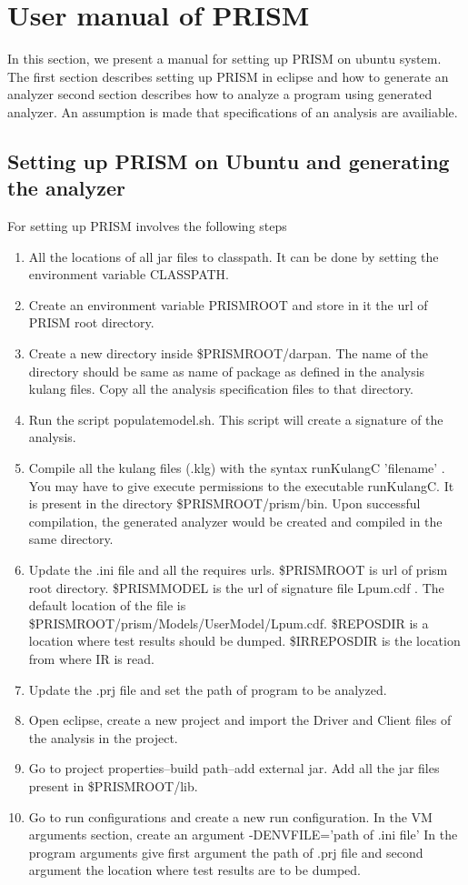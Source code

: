 \documentclass[12pt]{report}
\begin{document}
\newpage
\appendix
\chapter{User manual of PRISM}
In this section, we present a manual for setting up PRISM on ubuntu system. The first section describes setting up PRISM in eclipse and how to generate an analyzer second section describes how to analyze a program using generated analyzer. An assumption is made that specifications of an analysis are availiable.

\section{Setting up PRISM on Ubuntu and generating the analyzer}
For setting up PRISM involves the following steps

\begin{enumerate}
\item All the locations of all jar files to classpath. It can be done by setting the environment variable CLASSPATH.
\item Create an environment variable PRISMROOT and store in it the url of PRISM root directory.
\item Create a new directory inside \$PRISMROOT/darpan. The name of the directory should be same as name of package as defined in the analysis kulang files. Copy all the analysis specification files to that directory.
\item Run the script populatemodel.sh. This script will create a signature of the analysis.
\item Compile all the kulang files (.klg) with the syntax runKulangC 'filename' . You may have to give execute permissions to the executable runKulangC. It is present in the directory \$PRISMROOT/prism/bin. Upon successful compilation, the generated analyzer would be created and compiled in the same directory.
\item Update the .ini file and all the requires urls. \$PRISMROOT is url of prism root directory. \$PRISMMODEL is the url of signature file Lpum.cdf . The default location of the file is \$PRISMROOT/prism/Models/UserModel/Lpum.cdf. \$REPOSDIR is a location where test results should be dumped. \$IRREPOSDIR is the location from where IR is read.
\item Update the .prj file and set the path of program to be analyzed.
\item Open eclipse, create a new project and import the Driver and Client files of the analysis in the project.
\item Go to project properties--build path--add external jar. Add all the jar files present in \$PRISMROOT/lib.
\item Go to run configurations and create a new run configuration. In the VM arguments section, create an argument -DENVFILE='path of .ini file' In the program arguments give first argument the path of .prj file and second argument the location where test results are to be dumped.
\end{enumerate}
\end{document}
